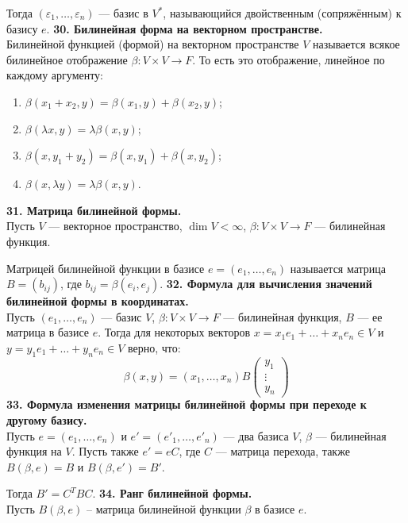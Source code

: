 \documentclass{article}
\begin{document}
Тогда $(\varepsilon_1, \ldots, \varepsilon_n)$ --- базис в $V^*$, называющийся двойственным (сопряжённым) к базису $e$.
\newline
\newline
\textbf{30. Билинейная форма на векторном пространстве.}\\
Билинейной функцией (формой) на векторном пространстве $V$ называется всякое билинейное отображение $\beta \colon V \times V \rightarrow F$. То есть это отображение, линейное по каждому аргументу:
\begin{enumerate}
\item $\beta(x_1 + x_2, y) = \beta(x_1, y) + \beta(x_2, y)$; 
\item $\beta(\lambda x, y) = \lambda\beta(x, y)$;
\item $\beta(x, y_1 + y_2) = \beta(x, y_1) + \beta(x, y_2)$;
\item $\beta(x, \lambda y) = \lambda\beta(x, y)$.
\end{enumerate}
\textbf{31. Матрица билинейной формы.}\\
Пусть $V$ --- векторное пространство, $\dim V < \infty$, $\beta \colon V \times V \rightarrow F$ --- билинейная функция.

Матрицей билинейной функции в базисе $e = (e_1, \ldots, e_n)$ называется матрица $B = (b_{ij})$, где $b_{ij}= \beta(e_i, e_j)$.
\newline
\newline
\textbf{32. Формула для вычисления значений билинейной формы в координатах.}\\
Пусть $(e_1, \ldots, e_n)$ --- базис $V$, $\beta \colon V \times V \to F$ --- билинейная функция, $B$ --- ее матрица в базисе $e $. Тогда для некоторых векторов $x = x_1e_1 + \ldots + x_ne_n \in V$ и $y = y_1e_1 + \ldots + y_ne_n \in V$ верно, что:
$$
\beta(x, y) = (x_1, \ldots, x_n)B \begin{pmatrix}y_1\\ \vdots \\ y_n \end{pmatrix}
$$
\textbf{33. Формула изменения матрицы билинейной формы при переходе к другому базису.}\\
Пусть $e = (e_1, \ldots, e_n)$ и $e' = (e'_1, \ldots, e'_n)$ --- два базиса $V$, $\beta$ --- билинейная функция на $V$. Пусть также $e' = e C$, где $C$ --- матрица перехода, также $B(\beta, e) = B$ и $B(\beta, e') = B'$.

Тогда $B' = C^TBC$.
\newline
\newline
\textbf{34. Ранг билинейной формы.}\\
Пусть $B(\beta, e)$ -- матрица билинейной функции $\beta$ в базисе $e$.
\end{document}
